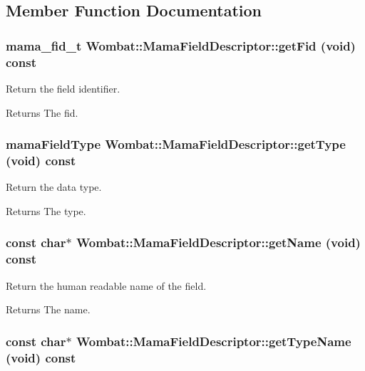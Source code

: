 \subsection{Member Function Documentation}
\hypertarget{classWombat_1_1MamaFieldDescriptor_afb11a9cdf32d945f6c6bc30e1d043e47}{
\subsubsection[{getFid}]{\setlength{\rightskip}{0pt plus 5cm}mama\_\-fid\_\-t Wombat::MamaFieldDescriptor::getFid (void) const}}
\label{classWombat_1_1MamaFieldDescriptor_afb11a9cdf32d945f6c6bc30e1d043e47}


Return the field identifier. \begin{DoxyReturn}{Returns}
The fid. 
\end{DoxyReturn}
\hypertarget{classWombat_1_1MamaFieldDescriptor_a1783c189fbe1218b8588b832e565193f}{
\subsubsection[{getType}]{\setlength{\rightskip}{0pt plus 5cm}mamaFieldType Wombat::MamaFieldDescriptor::getType (void) const}}
\label{classWombat_1_1MamaFieldDescriptor_a1783c189fbe1218b8588b832e565193f}


Return the data type. \begin{DoxyReturn}{Returns}
The type. 
\end{DoxyReturn}
\hypertarget{classWombat_1_1MamaFieldDescriptor_ada55a2d1cdca7e1e90395bd1033c63e6}{
\subsubsection[{getName}]{\setlength{\rightskip}{0pt plus 5cm}const char$\ast$ Wombat::MamaFieldDescriptor::getName (void) const}}
\label{classWombat_1_1MamaFieldDescriptor_ada55a2d1cdca7e1e90395bd1033c63e6}


Return the human readable name of the field. \begin{DoxyReturn}{Returns}
The name. 
\end{DoxyReturn}
\hypertarget{classWombat_1_1MamaFieldDescriptor_acd4bd3e856377a60fa553cfb5786e461}{
\subsubsection[{getTypeName}]{\setlength{\rightskip}{0pt plus 5cm}const char$\ast$ Wombat::MamaFieldDescriptor::getTypeName (void) const}}
\label{classWombat_1_1MamaFieldDescriptor_acd4bd3e856377a60fa553cfb5786e461}


